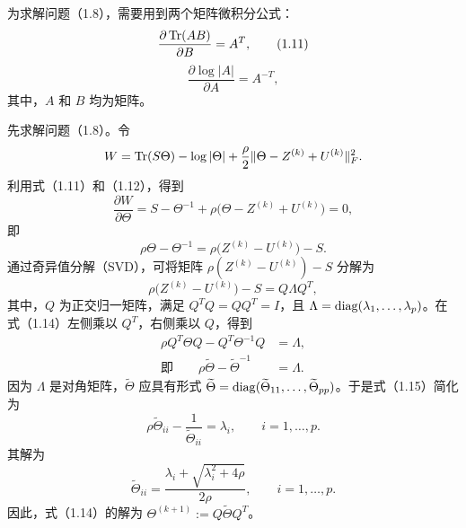 为求解问题（1.8），需要用到两个矩阵微积分公式：
\begin{equation}
\frac{\partial\operatorname{Tr}(AB)}{\partial B}=A^T,
\tag{1.11}
\end{equation}
\begin{equation}
\frac{\partial\log|A|}{\partial A}=A^{-T},
\tag{1.12}
\end{equation}
其中，$A$ 和 $B$ 均为矩阵。

先求解问题（1.8）。令
\[
W=\operatorname{Tr}(S\Theta)-\log|\Theta|+\frac\rho2\|\Theta-Z^{(k)}+U^{(k)}\|_F^2.
\]
利用式（1.11）和（1.12），得到
\begin{equation}
\frac{\partial W}{\partial\Theta}=S-\Theta^{-1}
+\rho\bigl(\Theta-Z^{(k)}+U^{(k)}\bigr)=0,
\tag{1.13}
\end{equation}
即
\begin{equation}
\rho\Theta-\Theta^{-1}=\rho\bigl(Z^{(k)}-U^{(k)}\bigr)-S.
\tag{1.14}
\end{equation}
通过奇异值分解（SVD），可将矩阵 $\rho(Z^{(k)}-U^{(k)})-S$ 分解为
\[
\rho\bigl(Z^{(k)}-U^{(k)}\bigr)-S=Q\Lambda Q^T,
\]
其中，$Q$ 为正交归一矩阵，满足 $Q^TQ=QQ^T=I$，且 $\Lambda=\operatorname{diag}(\lambda_1,\ldots,\lambda_p)$。在式（1.14）左侧乘以 $Q^T$，右侧乘以 $Q$，得到
\begin{equation}
\begin{aligned}
\rho Q^T\Theta Q-Q^T\Theta^{-1}Q&=\Lambda,\\
\text{即}\qquad \rho\widetilde\Theta-\widetilde\Theta^{-1}&=\Lambda.
\end{aligned}\tag{1.15}
\end{equation}
因为 $\Lambda$ 是对角矩阵，$\widetilde\Theta$ 应具有形式 $\widetilde\Theta=\operatorname{diag}(\widetilde\Theta_{11},\ldots,\widetilde\Theta_{pp})$。于是式（1.15）简化为
\begin{equation}
\rho\widetilde\Theta_{ii}-\frac1{\widetilde\Theta_{ii}}=\lambda_i,
\qquad i=1,\ldots,p.
\tag{1.16}
\end{equation}
其解为
\[
\widetilde\Theta_{ii}=\frac{\lambda_i+\sqrt{\lambda_i^2+4\rho}}{2\rho},
\qquad i=1,\ldots,p.
\]
因此，式（1.14）的解为 $\Theta^{(k+1)}:=Q\widetilde\Theta Q^T$。


